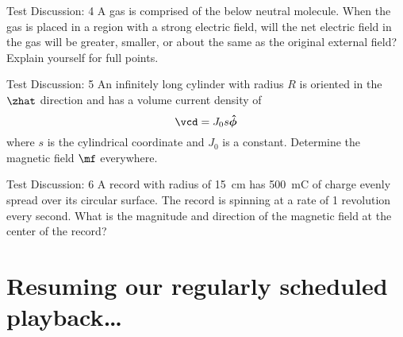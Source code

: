 \documentclass[pdf,aspectratio=169]{beamer}
\begin{document}
\begin{frame}{Test Discussion: 4}
		A gas is comprised of the below neutral molecule. When the gas is placed in a region with a strong electric field, will the net electric field in the gas will be greater, smaller, or about the same as the original external field? Explain yourself for full points.
		\begin{flushright}
		\end{flushright}
\end{frame}

\begin{frame}{Test Discussion: 5}
		An infinitely long cylinder with radius $R$ is oriented in the $\zhat$ direction and has a volume current density of 
		\[\vcd = J_0 s \vu*{\phi}\]
		where $s$ is the cylindrical coordinate and $J_0$ is a constant. Determine the magnetic field $\mf$ everywhere.
\end{frame}

\begin{frame}{Test Discussion: 6}
	A record with radius of \SI{15}{\centi\meter} has \SI{500}{\milli\coulomb} of charge evenly spread over its circular surface. The record is spinning at a rate of 1 revolution every second. What is the magnitude and direction of the magnetic field at the center of the record?
\end{frame}


\section{Resuming our regularly scheduled playback\ldots}
\end{document}
